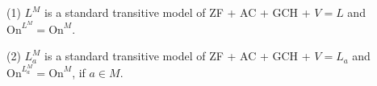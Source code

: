 (1) $L^M$ is a standard transitive model of ZF + AC + GCH + $V = L$ and $\text{On}^{L^M} = \text{On}^M$.

(2) $L^M_a$ is a standard transitive model of ZF + AC + GCH + $V = L_a$ and $\text{On}^{L^M_a} = \text{On}^M$, if $a \in M$.
